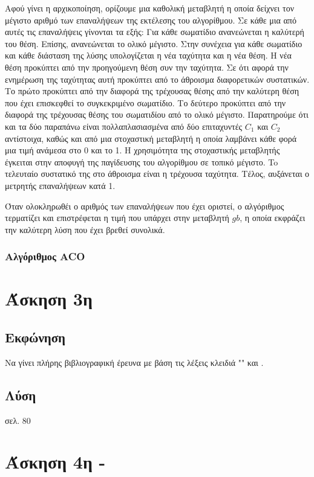 \documentclass{assignment}
\begin{document}
Αφού γίνει η αρχικοποίηση, ορίζουμε μια καθολική μεταβλητή η οποία δείχνει τον
μέγιστο αριθμό των επαναλήψεων της εκτέλεσης του αλγορίθμου. Σε κάθε μια από
αυτές τις επαναλήψεις γίνονται τα εξής: Για κάθε σωματίδιο ανανεώνεται
η καλύτερή του θέση. Επίσης, ανανεώνεται το ολικό μέγιστο. Στην συνέχεια για
κάθε σωματίδιο και κάθε διάσταση της λύσης υπολογίζεται η νέα ταχύτητα και
η νέα θέση. Η νέα θέση προκύπτει από την προηγούμενη θέση συν την ταχύτητα. Σε
ότι αφορά την ενημέρωση της ταχύτητας αυτή προκύπτει από το άθροισμα
διαφορετικών συστατικών. Το πρώτο προκύπτει από την διαφορά της τρέχουσας θέσης
από την καλύτερη θέση που έχει επισκεφθεί το συγκεκριμένο σωματίδιο. Το δεύτερο
προκύπτει από την διαφορά της τρέχουσας θέσης του σωματιδίου από το ολικό
μέγιστο. Παρατηρούμε ότι και τα δύο παραπάνω είναι πολλαπλασιασμένα από δύο
επιταχυντές $C_1$ και $C_2$ αντίστοιχα, καθώς και από μια στοχαστική μεταβλητή
η οποία λαμβάνει κάθε φορά μια τιμή ανάμεσα στο 0 και το 1. Η χρησιμότητα
της στοχαστικής μεταβλητής έγκειται στην αποφυγή της παγίδευσης του αλγορίθμου
σε τοπικό μέγιστο. To τελευταίο συστατικό της στο άθροισμα είναι η τρέχουσα
ταχύτητα. Τέλος, αυξάνεται ο μετρητής επαναλήψεων κατά 1.

Όταν ολοκληρωθέι ο αριθμός των επαναλήψεων που έχει οριστεί, ο αλγόριθμος
τερματίζει και επιστρέφεται η τιμή που υπάρχει στην μεταβλητή $gb$, η οποία
εκφράζει την καλύτερη λύση που έχει βρεθεί συνολικά.
\subsubsection*{Αλγόριθμος ACO}
\section{Άσκηση 3η}
\subsection{Εκφώνηση}

Να γίνει πλήρης βιβλιογραφική έρευνα με βάση τις λέξεις κλειδιά "" και .

\subsection {Λύση}

σελ. 80

\section{Άσκηση 4η - }
\end{document}
